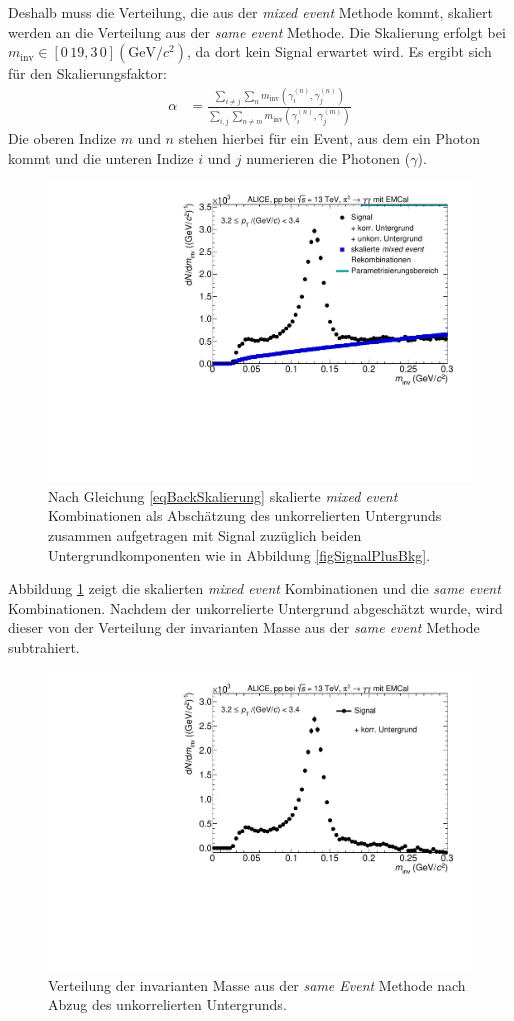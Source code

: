 Deshalb muss die Verteilung, die aus der \textit{mixed event} Methode kommt, skaliert werden an die Verteilung aus der \textit{same event} Methode.
Die Skalierung erfolgt bei $m_\text{inv} \in \left[0\,19,3\,0\right] (\text{GeV/}c^{2})$, da dort kein Signal erwartet wird.
Es ergibt sich für den Skalierungsfaktor:
\begin{align}
\label{eqBackSkalierung}
\alpha &= \frac{\sum_{i \neq j}\sum_{n}m_{\text{inv}}\left( \gamma^{(n)}_{i},\gamma^{(n)}_{j}\right) }{\sum_{i,j}\sum_{n \neq m}m_{\text{inv}}\left( \gamma^{(n)}_{i},\gamma^{(m)}_{j}\right) }
\end{align}
Die oberen Indize $m$ und $n$ stehen hierbei für ein Event, aus dem ein Photon kommt und die unteren Indize $i$ und $j$ numerieren die Photonen ($\gamma$).
\begin{figure}[tp]
\centering
\includegraphics[width=.75\linewidth]{hUncorrBkgNorm.pdf}
\caption{Nach Gleichung \ref{eqBackSkalierung} skalierte {\it mixed event} Kombinationen als Abschätzung des unkorrelierten Untergrunds zusammen aufgetragen mit Signal zuzüglich beiden Untergrundkomponenten wie in Abbildung \ref{figSignalPlusBkg}.}
\label{figUncorrBkgNorm}
\end{figure}
\newline
Abbildung \ref{figUncorrBkgNorm} zeigt die skalierten \textit{mixed event} Kombinationen und die \textit{same event} Kombinationen.
Nachdem der unkorrelierte Untergrund abgeschätzt wurde, wird dieser von der Verteilung der invarianten Masse aus der \textit{same event} Methode subtrahiert.
\begin{figure}[tp]
\centering
\includegraphics[width=.75\linewidth]{hInvMass_Data.pdf}
\caption{Verteilung der invarianten Masse aus der \textit{same Event} Methode nach Abzug des unkorrelierten Untergrunds.}
\label{figInvMass_Data}
\end{figure}
